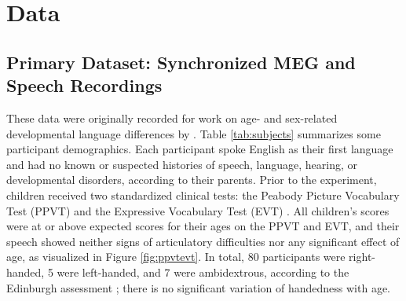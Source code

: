 \documentclass[utf8]{frontiersSCNS} %
\begin{document}



\section{Data}

\subsection{Primary Dataset: Synchronized MEG and Speech Recordings}

These data were originally recorded for work on age- and sex-related developmental language differences by \cite{Doesburg2016, Yu2014}. Table \ref{tab:subjects} summarizes some participant demographics. Each participant spoke English as their first language and had no known or suspected histories of speech, language, hearing, or developmental disorders, according to their parents. Prior to the experiment, children received two standardized clinical tests: the Peabody Picture Vocabulary Test (PPVT) \cite{Dunn97} and the Expressive Vocabulary Test (EVT) \cite{EVT}. All children's scores were at or above expected scores for their ages on the PPVT and EVT, and their speech showed neither signs of articulatory difficulties nor any significant effect of age, as visualized in Figure \ref{fig:ppvtevt}. In total, 80 participants were right-handed, 5 were left-handed, and 7 were ambidextrous, according to the Edinburgh assessment \cite{Oldfield}; there is no significant variation of handedness with age.
\end{document}
